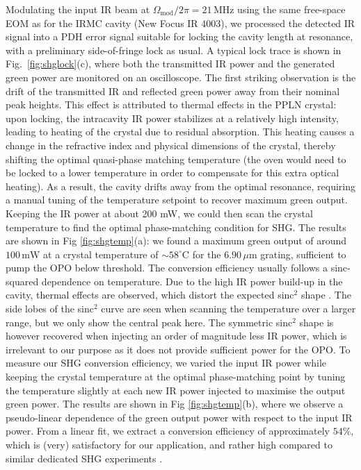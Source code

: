 Modulating the input IR beam at $\Omega_\mathrm{mod} / 2\pi= 21\,\mathrm{MHz}$ using the same free-space EOM as for the IRMC cavity (New Focus IR 4003), we processed the detected IR signal into a PDH error signal suitable for locking the cavity length at resonance, with a preliminary side-of-fringe lock as usual. A typical lock trace is shown in Fig.~\ref{fig:shglock}(c), where both the transmitted IR power and the generated green power are monitored on an oscilloscope. The first striking observation is the drift of the transmitted IR and reflected green power away from their nominal peak heights. This effect is attributed to thermal effects in the PPLN crystal: upon locking, the intracavity IR power stabilizes at a relatively high intensity, leading to heating of the crystal due to residual absorption. This heating causes a change in the refractive index and physical dimensions of the crystal, thereby shifting the optimal quasi-phase matching temperature (the oven would need to be locked to a lower temperature in order to compensate for this extra optical heating). As a result, the cavity drifts away from the optimal resonance, requiring a manual tuning of the temperature setpoint to recover maximum green output. Keeping the IR power at about 200 mW, we could then scan the crystal temperature to find the optimal phase-matching condition for SHG. The results are shown in Fig \ref{fig:shgtemp}(a): we found a maximum green output of around $100\,\mathrm{mW}$ at a crystal temperature of $\sim 58^{\circ}\mathrm{C}$ for the $6.90\,\mu\mathrm{m}$ grating, sufficient to pump the OPO below threshold. The conversion efficiency usually follows a sinc-squared dependence on temperature. Due to the high IR power build-up in the cavity, thermal effects are observed, which distort the expected sinc$^2$ shape \cite{boyd}. The side lobes of the sinc$^2$ curve are seen when scanning the temperature over a larger range, but we only show the central peak here. The symmetric sinc$^2$ shape is however recovered when injecting an order of magnitude less IR power, which is irrelevant to our purpose as it does not provide sufficient power for the OPO. To measure our SHG conversion efficiency, we varied the input IR power while keeping the crystal temperature at the optimal phase-matching point by tuning the temperature slightly at each new IR power injected to maximise the output green power. The results are shown in Fig \ref{fig:shgtemp}(b), where we observe a pseudo-linear dependence of the green output power with respect to the input IR power. From a linear fit, we extract a conversion efficiency of approximately $54\%$, which is (very) satisfactory for our application, and rather high compared to similar dedicated SHG experiments \cite{Vidal25}. \\ 

